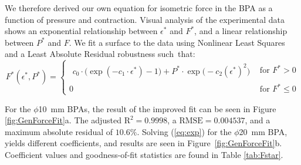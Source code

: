 \documentclass[actuators,article,accept,pdftex,moreauthors]{Definitions/mdpi}
\begin{document}
We therefore derived our own equation for isometric force in the BPA as a function of pressure and contraction. Visual analysis of the experimental data shows an exponential relationship between $\epsilon^*$ and $F^*$, and a linear relationship between $P^*$ and $F$. We fit a surface to the data using Nonlinear Least Squares and a Least Absolute Residual robustness such~that:
\begin{equation}
F^*(\epsilon^*,P^*)=
\begin{cases}
\begin{aligned}
c_0\cdot\bigl(\exp(-c_1 \cdot \epsilon^*)-1\bigr)
+ P^*\cdot\exp\!\bigl(-c_2(\epsilon^*)^{2}\bigr)
\end{aligned}
& \text{for } F^*>0\\[10pt]
0
& \text{for } F^*\le 0
\end{cases}\label{eq:exp}
\end{equation}

For the $\phi$\qty{10}{\mm} BPAs, the result of the improved fit can be seen in Figure \ref{fig:GenForceFit}{a}. The adjusted $\text{R}^2=0.9998$, a $\text{RMSE}=0.004537$, and a maximum absolute residual of $10.6\%$. Solving (\ref{eq:exp}) for the $\phi$\qty{20}{\mm} BPA, yields different coefficients, and results are seen in \mbox{Figure~\ref{fig:GenForceFit}{b}.} Coefficient values and goodness-of-fit statistics are found in Table \ref{tab:Fstar}. 
\end{document}
